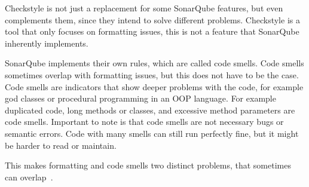 Checkstyle is not just a replacement for some SonarQube features, but even complements them, since they intend to solve different problems.
Checkstyle is a tool that only focuses on formatting issues, this is not a feature that SonarQube inherently implements.

SonarQube implements their own rules, which are called code smells.
Code smells sometimes overlap with formatting issues, but this does not have to be the case.
Code smells are indicators that show deeper problems with the code, for example god classes or procedural programming in an OOP language.
For example duplicated code, long methods or classes, and excessive method parameters are code smells.
Important to note is that code smells are not necessary bugs or semantic errors.
Code with many smells can still run perfectly fine, but it might be harder to read or maintain.

This makes formatting and code smells two distinct problems, that sometimes can overlap~\cite{sonarqube-key-concepts}.